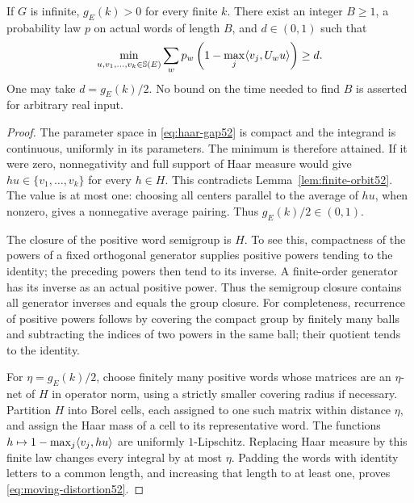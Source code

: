 \begin{lemma}
\label{lem:haar-word52}
If $G$ is infinite, $g_E(k)>0$ for every finite $k$. There exist an
integer $B\ge1$, a probability law $p$ on actual words of length $B$,
and $d\in(0,1)$ such that
\begin{equation}\label{eq:moving-distortion52}
 \min_{u,v_1,\ldots,v_k\in\mathbb S(E)}
 \sum_w p_w\left(1-\max_j\langle v_j,U_wu\rangle\right)\ge d.
\end{equation}
One may take $d=g_E(k)/2$. No bound on the time needed to find $B$
is asserted for arbitrary real input.
\end{lemma}
\begin{proof}
The parameter space in \eqref{eq:haar-gap52} is compact and the
integrand is continuous, uniformly in its parameters. The minimum is
therefore attained. If it were zero, nonnegativity and full support
of Haar measure would give $hu\in\{v_1,\ldots,v_k\}$ for every
$h\in H$. This contradicts Lemma~\ref{lem:finite-orbit52}.
The value is at most one: choosing all centers parallel to the
average of $hu$, when nonzero, gives a nonnegative average pairing.
Thus $g_E(k)/2\in(0,1)$.

The closure of the positive word semigroup is $H$. To see this,
compactness of the powers of a fixed orthogonal generator supplies
positive powers tending to the identity; the preceding powers then
tend to its inverse. A finite-order generator has its inverse as an
actual positive power. Thus the semigroup closure contains all
generator inverses and equals the group closure.
For completeness, recurrence of positive powers follows by covering
the compact group by finitely many balls and subtracting the indices
of two powers in the same ball; their quotient tends to the identity.

For $\eta=g_E(k)/2$, choose finitely many positive words whose
matrices are an $\eta$-net of $H$ in operator norm, using a strictly
smaller covering radius if necessary. Partition $H$ into Borel cells,
each assigned to one such matrix within distance $\eta$, and assign
the Haar mass of a cell to its representative word. The functions
$h\mapsto1-\max_j\langle v_j,hu\rangle$ are uniformly $1$-Lipschitz.
Replacing Haar measure by this finite law changes every integral by
at most $\eta$. Padding the words with identity letters to a common
length, and increasing that length to at least one, proves
\eqref{eq:moving-distortion52}.
\end{proof}

